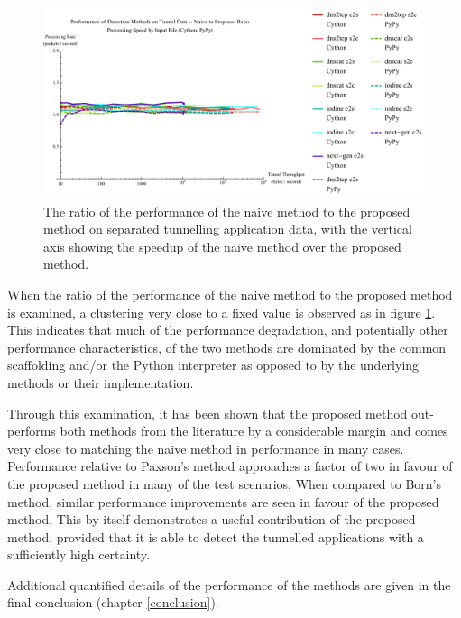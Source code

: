 \documentclass[12pt]{report}
\theoremstyle{remark}
\theoremstyle{definition}
\theoremstyle{definition}
\theoremstyle{definition}
\begin{document}
\begin{figure} \centering
\includegraphics[width=\textwidth]{figures/ppia-naive2proposed.pdf}
\caption[Performance Ratio of the Naive Method to the Proposed Method on Tunnel
Data by Python Interpreter]{The ratio of the performance of the naive method to
the proposed method on separated tunnelling application data, with the vertical
axis showing the speedup of the naive method over the proposed method.}
\label{ppia-naive2proposed} \end{figure}

When the ratio of the performance of the naive method to the proposed method is
examined, a clustering very close to a fixed value is observed as in figure
\ref{ppia-naive2proposed}. This indicates that much of the performance
degradation, and potentially other performance characteristics, of the two
methods are dominated by the common scaffolding and/or the Python interpreter as
opposed to by the underlying methods or their implementation.

Through this examination, it has been shown that the proposed method
out-performs both methods from the literature by a considerable margin and comes
very close to matching the naive method in performance in many cases.
Performance relative to Paxson's method approaches a factor of two in favour of
the proposed method in many of the test scenarios. When compared to Born's
method, similar performance improvements are seen in favour of the proposed
method. This by itself demonstrates a useful contribution of the proposed
method, provided that it is able to detect the tunnelled applications with a
sufficiently high certainty.

Additional quantified details of the performance of the methods are given in the
final conclusion (chapter \ref{conclusion}).
\end{document}
